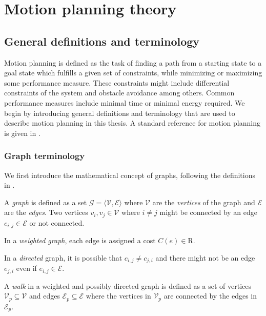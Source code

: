 \chapter{Motion planning theory}\label{cha:motion_planning}
\section{General definitions and terminology}
Motion planning is defined as the task of finding a
path from a starting state to a goal state which fulfills a given set of constraints, while minimizing or maximizing some 
performance measure.
These constraints might include differential constraints of the system and obstacle avoidance among others.
Common performance measures include minimal time or minimal energy required.
We begin by introducing general definitions and terminology that are used to
describe motion planning in this thesis. A standard reference for motion planning is given in 
\cite{planning_algorithms}.
\subsection{Graph terminology}
We first introduce the mathematical concept of graphs, following the definitions in \cite{graph_theory}.

\begin{definition}[Graph]
    A \textit{graph} is defined as a set $\mathcal{G}=\langle\mathcal{V},\mathcal{E}\rangle$ 
    where $\mathcal{V}$ are the \textit{vertices} of the graph and $\mathcal{E}$ are the \textit{edges}.
    Two vertices $v_i,v_j\in\mathcal{V}$ where $i\neq j$ might be connected by an edge $e_{i,j}\in\mathcal{E}$ or not connected.
\end{definition}
    
\begin{definition}
    In a \textit{weighted graph}, each edge is assigned a cost $C(e)\in\mathrm{R}$. 
\end{definition}


\begin{definition}
    In a \textit{directed} graph, it is possible that $c_{i,j}\neq c_{j,i}$ and
    there might not be an edge $e_{j,i}$ even if $e_{i,j}\in\mathcal{E}$.
\end{definition}

\begin{definition}[Walk]
    A \textit{walk} in a weighted and possibly directed graph is defined as a set of vertices
    $\mathcal{V}_p\subseteq\mathcal{V}$ and edges $\mathcal{E}_p\subseteq\mathcal{E}$ where the vertices in 
    $\mathcal{V}_p$ are connected by the edges in $\mathcal{E}_p$.
\end{definition}


